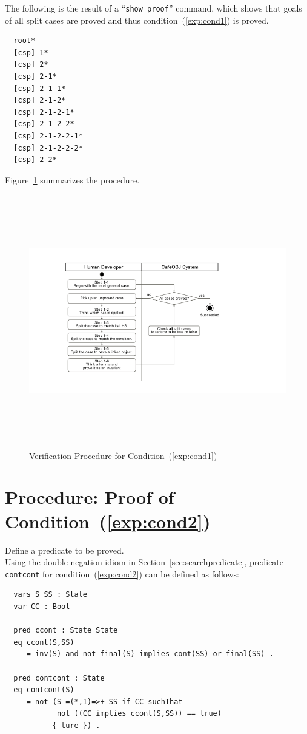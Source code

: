 \documentclass[12pt]{report}
\newcommand{\stt}[1]{{\small{\tt {#1}}}}
\begin{document}
The following is the result of a ``\stt{show proof}'' command, which shows
that goals of all split cases are proved and thus
condition~(\ref{exp:cond1}) is proved.
\begin{verbatim}
  root*
  [csp] 1*
  [csp] 2*
  [csp] 2-1*
  [csp] 2-1-1*
  [csp] 2-1-2*
  [csp] 2-1-2-1*
  [csp] 2-1-2-2*
  [csp] 2-1-2-2-1*
  [csp] 2-1-2-2-2*
  [csp] 2-2*
\end{verbatim}

Figure~\ref{fig:procedure1} summarizes the procedure.
\begin{figure}
\centering
\includegraphics[height=11cm,natwidth=720,natheight=405,clip,trim=100 55 190 40]{procedure1.png}
\caption{Verification Procedure for Condition~(\ref{exp:cond1})}
\label{fig:procedure1}
\end{figure}

\section{Procedure: Proof of Condition~(\ref{exp:cond2})}
\label{sec:contcont}
 Define a predicate to be proved. \\ Using the
double negation idiom in Section~\ref{sec:searchpredicate}, predicate
{\tt contcont} for condition~(\ref{exp:cond2}) can be defined as follows:
\begin{verbatim}
  vars S SS : State
  var CC : Bool

  pred ccont : State State
  eq ccont(S,SS)
     = inv(S) and not final(S) implies cont(SS) or final(SS) .

  pred contcont : State
  eq contcont(S)
     = not (S =(*,1)=>+ SS if CC suchThat
            not ((CC implies ccont(S,SS)) == true)
     	   { ture }) .
\end{verbatim}
\end{document}
